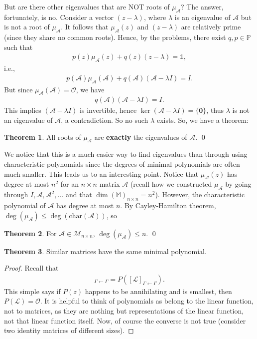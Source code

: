 \documentclass{book}
\theoremstyle{definition}
\newtheorem{thm}{Theorem}[section]
\newcommand{\A}{\mathcal{A}}
\newcommand{\lag}{\mathcal{L}}
\newcommand{\M}{\mathcal{M}}
\begin{document}
But are there other eigenvalues that are NOT roots of $\mu_\A$? The answer, fortunately, is no. Consider a vector $(z - \lambda)$, where $\lambda$ is an eigenvalue of $\A$ but is not a root of $\mu_\A$. It follows that $\mu_\A(z)$ and $(z- \lambda)$ are relatively prime (since they share no common roots). Hence, by the problems, there exist $q,p\in \mathbb{P}$ such that 
\begin{align*}
p(z)\mu_\A(z) + q(z)(z-\lambda) = \mathbb{1}, 
\end{align*}
i.e.,
\begin{align*}
p(\A)\mu_\A(\A) + q(\A)(\A-\lambda I) = I.
\end{align*}
But since $\mu_{\A}(\A) = \mathcal{O}$, we have
\begin{align*}
q(\A)(\A-\lambda I) = I.
\end{align*}
This implies $(\A-\lambda I)$ is invertible, hence $\ker(\A - \lambda I) = \{ \mathbf{0} \}$, thus $\lambda$ is not an eigenvalue of $\A$, a contradiction. So no such $\lambda$ exists. So, we have a theorem:

\begin{thm}
	All roots of $\mu_\A$ are \textbf{exactly} the eigenvalues of $\A$. \qed
\end{thm}

We notice that this is a much easier way to find eigenvalues than through using characteristic polynomials since the degrees of minimal polynomials are often much smaller. This leads us to an interesting point. Notice that $\mu_\A(z)$ has degree at most $n^2$ for an $n\times n$ matrix $\A$ (recall how we constructed $\mu_\A$ by going through $I,\A,\A^2,\dots$ and that $\dim(\mathbb{M})_{n\times n} = n^2$). However, the characteristic polynomial of $\A$ has degree at most $n$. By Cayley-Hamilton theorem, $\deg(\mu_\A) \leq \deg(\text{char} (\A))$, so

\begin{thm}
	For $\A \in \M_{n\times n}$, $\deg(\mu_\A) \leq n$. \qed 
\end{thm}


\begin{thm}
	Similar matrices have the same minimal polynomial.
	
	\begin{proof}
		Recall that 
		\begin{align*}
		[P(\lag)]_{\Gamma\leftarrow\Gamma} = P\left([\lag]_{\Gamma\leftarrow\Gamma}\right).
		\end{align*}
		This simple says if $P(z)$ happens to be annihilating and is smallest, then $P(\lag) = \mathcal{O}$. It is helpful to think of polynomials as belong to the linear function, not to matrices, as they are nothing but representations of the linear function, not that linear function itself. Now, of course the converse is not true (consider two identity matrices of different sizes).
	\end{proof}
\end{thm}
\end{document}

